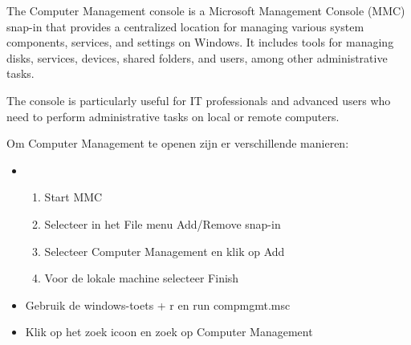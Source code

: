 The Computer Management console is a Microsoft Management Console (MMC) snap-in that provides a centralized location for managing various system components, services, and settings on Windows. It includes tools for managing disks, services, devices, shared folders, and users, among other administrative tasks.

The console is particularly useful for IT professionals and advanced users who need to perform administrative tasks on local or remote computers.

Om Computer Management te openen zijn er verschillende manieren:
\begin{itemize}
\item
	\begin{enumerate}
		\item Start MMC
		\item Selecteer in het File menu Add/Remove snap-in
		\item Selecteer Computer Management en klik op Add
		\item Voor de lokale machine selecteer Finish
	\end{enumerate}
\item Gebruik de windows-toets + r en run compmgmt.msc
\item Klik op het zoek icoon en zoek op Computer Management
\end{itemize}

\begin{minipage}[t]{\linewidth}
\raggedright
{}
\end{minipage}

